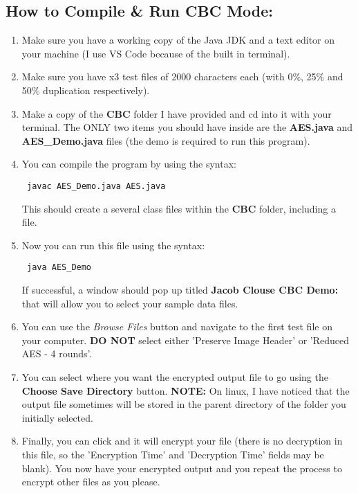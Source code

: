 \documentclass[10pt]{article}
\begin{document}
\subsection{How to Compile \& Run CBC Mode: } 
\begin{enumerate}
	\item Make sure you have a working copy of the Java JDK and a text editor on your machine (I use VS Code because of the built in terminal).
	
	\item Make sure you have x3 test files of 2000 characters each (with 0\%, 25\% and 50\% duplication respectively).
	
	\item Make a copy of the \textbf{CBC} folder I have provided and cd into it with your terminal. The ONLY two items you should have inside are the \textbf{AES.java} and \textbf{AES\_Demo.java} files (the demo is required to run this program).
	
	\item You can compile the program by using the syntax: \begin{verbatim} javac AES_Demo.java AES.java \end{verbatim}
	This should create a several class files within the \textbf{CBC} folder, including a  file.
	
	\item Now you can run this file using the syntax: 
	\begin{verbatim} java AES_Demo \end{verbatim} 
	If successful, a window should pop up titled \textbf{Jacob Clouse CBC Demo:} that will allow you to select your sample data files. 
	
	\item You can use the \textit{Browse Files} button and navigate to the first test file on your computer. \textbf{DO NOT} select either 'Preserve Image Header' or 'Reduced AES - 4 rounds'. 
	
	\item You can select where you want the encrypted output file to go using the \textbf{Choose Save Directory} button. \textbf{NOTE:} On linux, I have noticed that the output file sometimes will be stored in the parent directory of the folder you initially selected. 
	
	\item Finally, you can click  and it will encrypt your file (there is no decryption in this file, so the 'Encryption Time' and  'Decryption Time' fields may be blank). You now have your encrypted output and you repeat the process to encrypt other files as you please.
	

\end{enumerate}
\end{document}

